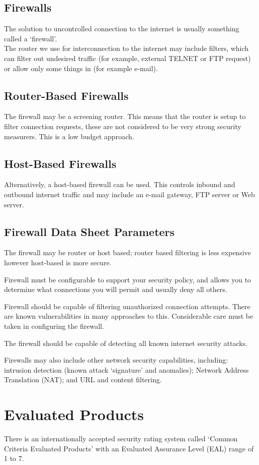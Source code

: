 \subsection*{Firewalls}
The solution to uncontrolled connection to the internet is usually something called a `firewall'.\\

The router we use for interconnection to the internet may include filters, which can filter out undesired traffic (for example, external TELNET or FTP request) or allow only some things in (for example e-mail). 
\subsection*{Router-Based Firewalls}
The firewall may be a screening router. This means that the router is setup to filter connection requests, these are not considered to be very strong security measurers. This is a low budget approach.
\subsection*{Host-Based Firewalls}
Alternatively, a host-based firewall can be used. This controls inbound and outbound internet traffic and may include an e-mail gateway, FTP server or Web server. 
\subsection*{Firewall Data Sheet Parameters}
The firewall may be router or host based; router based filtering is less expensive however host-based is more secure.

Firewall must be configurable to support your security policy, and allows you to determine what connections you will permit and usually deny all others. 

Firewall should be capable of filtering unauthorized connection attempts. There are known vulnerabilities in many approaches to this. Considerable care must be taken in configuring the firewall.

The firewall should be capable of detecting all known internet security attacks.

Firewalls may also include other network security capabilities, including: intrusion detection (known attack `signature' and anomalies); Network Address Translation (NAT); and URL and content filtering. 

\section*{Evaluated Products}
There is an internationally accepted security rating system called `Common Criteria Evaluated Products' with an Evaluated Assurance Level (EAL) range of 1 to 7.

